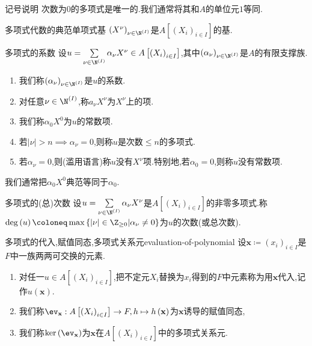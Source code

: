 \begin{remark}{记号说明}{}
	次数为$0$的多项式是唯一的.我们通常将其和$A$的单位元$1$等同.
\end{remark}

\begin{proposition}{多项式代数的典范单项式基}{}
	$\left(X^{\nu}\right)_{\nu\in\N^{\left(I\right)}}$是$A\left[\left(X_{i}\right)_{i\in I}\right]$的基.
\end{proposition}

\begin{definition}{多项式的系数}{}
	设$u=\sum\limits_{\nu\in\N^{\left(I\right)}}\alpha_{\nu}X^{\nu}\in A\left[\left(X_{i}\right)_{i\in I}\right]$,其中$\left(\alpha_{\nu}\right)_{\nu\in\N^{\left(I\right)}}$是$A$的有限支撑族.
	\begin{enumerate}
		\item 我们称$\left(\alpha_{\nu}\right)_{\nu\in\N^{\left(I\right)}}$是$u$的系数.
		\item 对任意$\nu\in\N^{\left(I\right)}$,称$a_{\nu}X^{\nu}$为$X^{\nu}$上的项.
		\item 我们称$\alpha_{0}X^{0}$为$u$的常数项.
		\item 若$\left|\nu\right|>n\implies\alpha_{\nu}=0$,则称$u$是次数$\leq n$的多项式.
		\item 若$\alpha_{\nu}=0$,则(滥用语言)称$u$没有$X^{\nu}$项.特别地,若$\alpha_{0}=0$,则称$u$没有常数项.
	\end{enumerate}
\end{definition}

\begin{convention}{}{}
	我们通常把$\alpha_{0}X^{0}$典范等同于$\alpha_{0}$.
\end{convention}

\begin{definition}{多项式的(总)次数}{}
	设$u=\sum\limits_{\nu\in\N^{\left(I\right)}}\alpha_{\nu}X^{\nu}$是$A\left[\left(X_{i}\right)_{i\in I}\right]$的非零多项式.称$\deg\left(u\right)\coloneq\max\left\{\left|\nu\right|\in\Z_{\geq 0}\middle|\alpha_{\nu}\neq 0\right\}$为$u$的次数(或总次数).
\end{definition}

\begin{definition}{多项式的代入,赋值同态,多项式关系元}{evaluation-of-polynomial}
	设$\mathbf{x}\coloneq\left(x_{i}\right)_{i\in I}$是$F$中一族两两可交换的元素.
	\begin{enumerate}
		\item 对任一$u\in A\left[\left(X_{i}\right)_{i\in I}\right]$,把不定元$X_{i}$替换为$x_{i}$得到的$F$中元素称为用$\mathbf{x}$代入,记作$u\left(\mathbf{x}\right)$.
		\item 我们称$\ev_{\mathbf{x}}:A\left[\left(X_{i}\right)_{i\in I}\right]\to F,h\mapsto h\left(\mathbf{x}\right)$为$\mathbf{x}$诱导的赋值同态,
		\item 我们称$\ker\left(\ev_{\mathbf{x}}\right)$为$\mathbf{x}$在$A\left[\left(X_{i}\right)_{i\in I}\right]$中的多项式关系元.
	\end{enumerate}
\end{definition}

